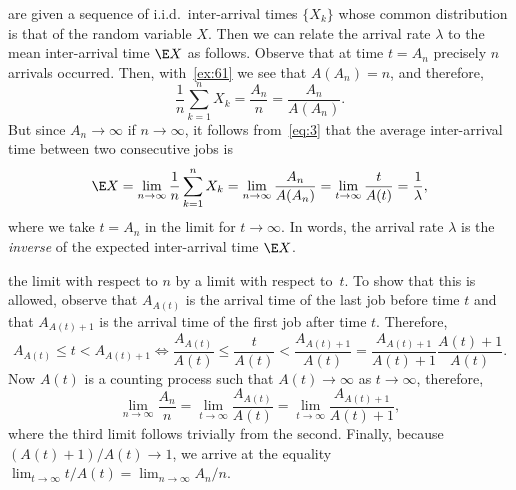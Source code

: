  are given a sequence of i.i.d.\ inter-arrival times  $\{X_k\}$ whose common distribution is that of the random variable $X$. Then we can relate the arrival rate $\lambda$ to the mean inter-arrival time $\E X$ as follows.
Observe that at time $t=A_n$ precisely $n$ arrivals occurred.
Then, with~\cref{ex:61}
we see that $A(A_n) = n$, and therefore,
\begin{equation*}
 \frac{1}n\sum_{k=1}^n X_k = \frac{A_n}n = \frac{A_n}{A(A_n)}. 
\end{equation*}
But since $A_n\to\infty$ if $n\to\infty$, it follows from~\cref{eq:3} that the average inter-arrival time between two consecutive jobs is
\begin{equation}\label{eq:54}
 \E X = \lim_{n\to\infty} \frac{1}n\sum_{k=1}^n X_k = \lim_{n\to \infty} \frac{A_n}{A(A_n)} = \lim_{t\to\infty} \frac t{A(t)} = \frac 1 \lambda,
\end{equation}
where we take $t=A_n$ in the limit for $t\to\infty$.
In words, the arrival rate $\lambda$ is the \emph{inverse} of the expected inter-arrival time $\E X$.


 the limit with respect to $n$ by a limit with respect to~$t$.
To show that this is allowed, observe that $A_{A(t)}$ is the arrival time of the last job before time $t$ and that $A_{A(t)+1}$ is the arrival time of the first job after time $t$.
Therefore,
 \begin{equation*}
 A_{A(t)} \leq t < A_{A(t)+1} \Leftrightarrow 
 \frac{A_{A(t)}} {A(t)} \leq \frac{t}{A(t)} <\frac{A_{A(t)+1}}{A(t)} = \frac{A_{A(t)+1}}{A(t)+1}\frac{A(t)+1}{A(t)}.
 \end{equation*}
 Now $A(t)$ is a counting process such that $A(t)\to\infty$ as $t\to\infty$, therefore,
 \begin{equation*}
\lim_{n\to\infty} \frac{A_n}{n} = \lim_{t\to\infty} \frac{A_{A(t)}}{A(t)} = \lim_{t\to\infty} \frac{A_{A(t)+1}}{A(t)+1},
 \end{equation*}
 where the third limit follows trivially from the second.
 Finally, because $(A(t)+1)/A(t)\to 1$, we arrive at the equality $\lim_{t\to\infty} t/A(t) = \lim_{n\to\infty} A_n/n$.

